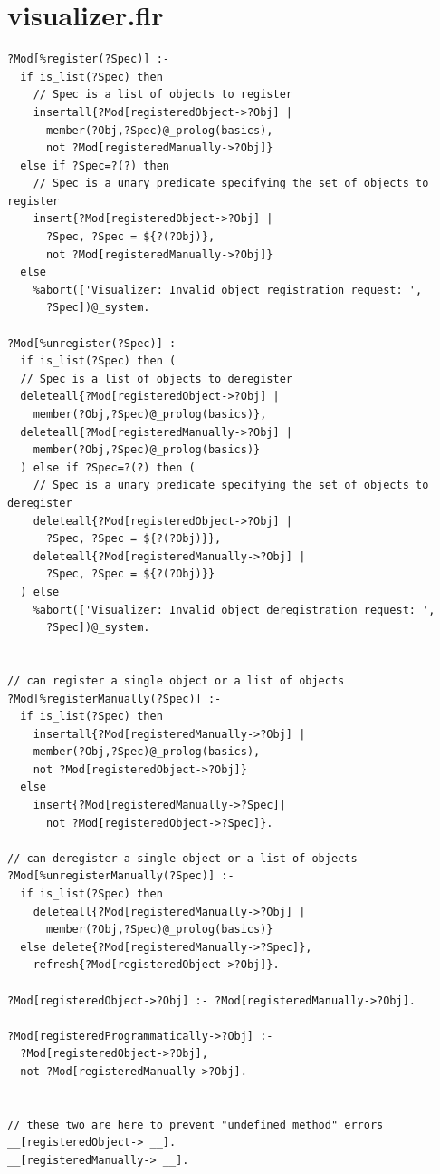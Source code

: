 \documentclass[a4paper,11pt]{article}
\begin{document}
\section{visualizer.flr}
\label{appendix:visualizer.flr}
\begin{verbatim}
?Mod[%register(?Spec)] :-
  if is_list(?Spec) then
    // Spec is a list of objects to register
    insertall{?Mod[registeredObject->?Obj] |
      member(?Obj,?Spec)@_prolog(basics),
      not ?Mod[registeredManually->?Obj]}
  else if ?Spec=?(?) then
    // Spec is a unary predicate specifying the set of objects to register
    insert{?Mod[registeredObject->?Obj] |
      ?Spec, ?Spec = ${?(?Obj)},
      not ?Mod[registeredManually->?Obj]}
  else
    %abort(['Visualizer: Invalid object registration request: ',
      ?Spec])@_system.

?Mod[%unregister(?Spec)] :-
  if is_list(?Spec) then (
  // Spec is a list of objects to deregister
  deleteall{?Mod[registeredObject->?Obj] |
    member(?Obj,?Spec)@_prolog(basics)},
  deleteall{?Mod[registeredManually->?Obj] |
    member(?Obj,?Spec)@_prolog(basics)}
  ) else if ?Spec=?(?) then (
    // Spec is a unary predicate specifying the set of objects to deregister
    deleteall{?Mod[registeredObject->?Obj] |
      ?Spec, ?Spec = ${?(?Obj)}},
    deleteall{?Mod[registeredManually->?Obj] |
      ?Spec, ?Spec = ${?(?Obj)}}
  ) else
    %abort(['Visualizer: Invalid object deregistration request: ',
      ?Spec])@_system.


// can register a single object or a list of objects
?Mod[%registerManually(?Spec)] :-
  if is_list(?Spec) then
    insertall{?Mod[registeredManually->?Obj] |
    member(?Obj,?Spec)@_prolog(basics),
    not ?Mod[registeredObject->?Obj]}
  else
    insert{?Mod[registeredManually->?Spec]|
      not ?Mod[registeredObject->?Spec]}.

// can deregister a single object or a list of objects
?Mod[%unregisterManually(?Spec)] :-
  if is_list(?Spec) then
    deleteall{?Mod[registeredManually->?Obj] |
      member(?Obj,?Spec)@_prolog(basics)}
  else delete{?Mod[registeredManually->?Spec]},
    refresh{?Mod[registeredObject->?Obj]}.

?Mod[registeredObject->?Obj] :- ?Mod[registeredManually->?Obj].

?Mod[registeredProgrammatically->?Obj] :-
  ?Mod[registeredObject->?Obj],
  not ?Mod[registeredManually->?Obj].


// these two are here to prevent "undefined method" errors
__[registeredObject-> __].
__[registeredManually-> __].


\end{verbatim}
\end{document}
